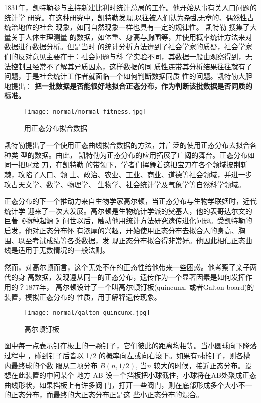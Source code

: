 1831年，凯特勒参与主持新建比利时统计总局的工作。他开始从事有关人口问题的统计学
研究。在这种研究中，凯特勒发现,以往被人们认为杂乱无章的、偶然性占统治地位的社会
现象，如同自然现象一样也具有一定的规律性。 凯特勒 搜集了大量关于人体生理测量
的数据，如体重、身高与胸围等，并使用概率统计方法来对数据进行数据分析。但是当时
的统计分析方法遭到了社会学家的质疑，社会学家们的反对意见主要在于：社会问题与科
学实验不同，其数据一般由观察得到，无法控制且经常不了解其异质因素，这样数据的同
质性连带其分析结果往往就有了问题，于是社会统计工作者就面临一个如何判断数据同质
性的问题。凯特勒大胆地提出：
{\bf 把一批数据是否能很好地拟合正态分布，作为判断该批数据是否同质的标准。}
\begin{figure}[H]
\centering
\texttt{[image: normal/normal\_fitness.jpg]}
\caption{用正态分布拟合数据}
\end{figure}

凯特勒提出了一个使用正态曲线拟合数据的方法，并广泛的使用正态分布去拟合各种类
型的数据。由此， 凯特勒为正态分布的应用拓展了广阔的舞台。正态分布如同一把屠龙
刀，在凯特勒 的带领下，学者们挥舞着这把宝刀在各个领域披荆斩棘，攻陷了人口、领
土、政治、农业、工业、商业、道德等社会领域，并进一步攻占天文学、数学、物理学、
生物学、社会统计学及气象学等自然科学领域。

正态分布的下一个推动力来自生物学家高尔顿，当正态分布与生物学联姻时，近代统计学
迎来了一次大发展。高尔顿是生物统计学派的奠基人，他的表哥达尔文的巨著《物种起源
》问世以后，触动他用统计方法研究遗传进化问题。受凯特勒的启发，他对正态分布怀
有浓厚的兴趣，开始使用正态分布去拟合人的身高、胸围、以至考试成绩等各类数据，发
现正态分布拟合得非常好。他因此相信正态曲线是适用于无数情况的一般法则。

然而，对高尔顿而言，这个无处不在的正态性给他带来一些困惑。他考察了亲子两代的身
高数据，发现遵从同一的正态分布，遗传作为一个显著因素是如何发挥作用的？1877年，
高尔顿设计了一个叫高尔顿钉板(quincunx, 或者Galton board)的装置，模拟正态分布的
性质，用于解释遗传现象。

\begin{figure}[H]
\begin{center}
\texttt{[image: normal/galton\_quincunx.jpg]}
\caption{高尔顿钉板}
\end{center}
\end{figure}

图中每一点表示钉在板上的一颗钉子，它们彼此的距离均相等。当小圆球向下降落过程中
，碰到钉子后皆以 1/2 的概率向左或向右滚下。如果有n排钉子，则各槽内最终球的个数
服从二项分布 $B(n,1/2)$, 当$n$ 较大的时候，接近正态分布。设想在此装置的中间某个
地方 AB 设一个挡板把小球截住，小球将在AB处聚成正态曲线形状，如果挡板上有许多阀
门，打开一些阀门，则在底部形成多个大小不一的正态分布，而最终的大正态分布正是这
些小正态分布的混合。

